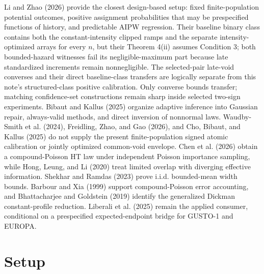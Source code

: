 \documentclass{article}
\begin{document}
Li and Zhao (2026) provide the closest design-based setup: fixed finite-population potential outcomes, positive assignment probabilities that may be prespecified functions of history, and predictable AIPW regression. Their baseline binary class contains both the constant-intensity clipped ramps and the separate intensity-optimized arrays for every \(n\), but their Theorem 4(ii) assumes Condition 3; both bounded-hazard witnesses fail its negligible-maximum part because late standardized increments remain nonnegligible. The selected-pair late-void converses and their direct baseline-class transfers are logically separate from this note's structured-class positive calibration. Only converse bounds transfer; matching confidence-set constructions remain sharp inside selected two-sign experiments. Bibaut and Kallus (2025) organize adaptive inference into Gaussian repair, always-valid methods, and direct inversion of nonnormal laws. Waudby-Smith et al. (2024), Freidling, Zhao, and Gao (2026), and Cho, Bibaut, and Kallus (2025) do not supply the present finite-population signed atomic calibration or jointly optimized common-void envelope. Chen et al. (2026) obtain a compound-Poisson HT law under independent Poisson importance sampling, while Hong, Leung, and Li (2020) treat limited overlap with diverging effective information. Shekhar and Ramdas (2023) prove i.i.d. bounded-mean width bounds. Barbour and Xia (1999) support compound-Poisson error accounting, and Bhattacharjee and Goldstein (2019) identify the generalized Dickman constant-profile reduction. Liberali et al. (2025) remain the applied consumer, conditional on a prespecified expected-endpoint bridge for GUSTO-1 and EUROPA.

\section{Setup}
\end{document}
